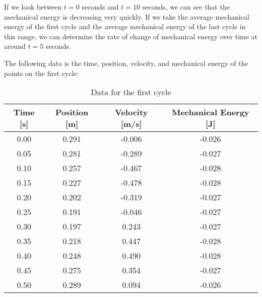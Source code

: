\documentclass[titlepage]{article}
\begin{document}
            
            If we look between $t=0$ seconds and $t=10$ seconds, we can see that the mechanical energy is decreasing very quickly.
            If we take the average mechanical energy of the first cycle and the average mechanical energy of the last cycle in this range, we can determine the rate of change of mechanical energy over time at around $t = 5$ seconds.
            
            
            The following data is the time, position, velocity, and mechanical energy of the points on the first cycle:
            \begin{table}[H]
                \centering
                \small
                \begin{tabular}{|c|c|c|c|}
                    \hline
                    Time [s] & Position [m] & Velocity [m/s] & Mechanical Energy [J] \\
                    \hline
                    0.00     & 0.291        & -0.006         & -0.026                \\
                    \hline
                    0.05     & 0.281        & -0.289         & -0.027                \\
                    \hline
                    0.10     & 0.257        & -0.467         & -0.028                \\
                    \hline
                    0.15     & 0.227        & -0.478         & -0.028                \\
                    \hline
                    0.20     & 0.202        & -0.319         & -0.027                \\
                    \hline
                    0.25     & 0.191        & -0.046         & -0.027                \\
                    \hline
                    0.30     & 0.197        & 0.243          & -0.027                \\
                    \hline
                    0.35     & 0.218        & 0.447          & -0.028                \\
                    \hline
                    0.40     & 0.248        & 0.490          & -0.028                \\
                    \hline
                    0.45     & 0.275        & 0.354          & -0.027                \\
                    \hline
                    0.50     & 0.289        & 0.094          & -0.026                \\
                    \hline
                \end{tabular}
                \caption{Data for the first cycle}\label{tab:first-cycle-mechanical-energy-table}
            \end{table}
            
\end{document}
